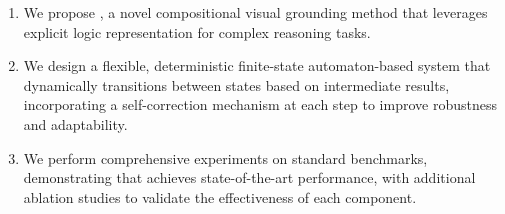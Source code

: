 \begin{enumerate} 
    \item We propose \methodname{}, a novel compositional visual grounding method that leverages explicit logic representation for complex reasoning tasks.
    \item We design a flexible, deterministic finite-state automaton-based system that dynamically transitions between states based on intermediate results, incorporating a self-correction mechanism at each step to improve robustness and adaptability.
    \item We perform comprehensive experiments on standard benchmarks, demonstrating that \methodname{} achieves state-of-the-art performance, with additional ablation studies to validate the effectiveness of each component. 
\end{enumerate}

